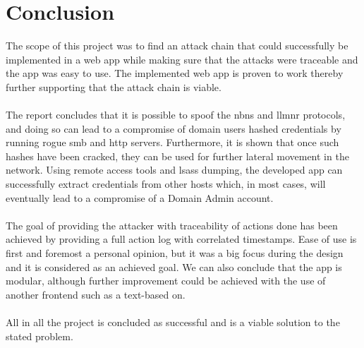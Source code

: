 \documentclass{article}
\begin{document}
\section{Conclusion}
The scope of this project was to find an attack chain that could successfully be implemented in a web app while making sure that the attacks were traceable and the app was easy to use. The implemented web app is proven to work thereby further supporting that the attack chain is viable.
\\
\\
The report concludes that it is possible to spoof the \gls{nbns} and \gls{llmnr} protocols, and doing so can lead to a compromise of domain users hashed credentials by running rogue \gls{smb} and \gls{http} servers. Furthermore, it is shown that once such hashes have been cracked, they can be used for further lateral movement in the network. Using remote access tools and \gls{lsass} dumping, the developed app can successfully extract credentials from other hosts which, in most cases, will eventually lead to a compromise of a Domain Admin account.
\\
\\
The goal of providing the attacker with traceability of actions done has been achieved by providing a full action log with correlated timestamps. Ease of use is first and foremost a personal opinion, but it was a big focus during the design and it is considered as an achieved goal. We can also conclude that the app is modular, although further improvement could be achieved with the use of another frontend such as a text-based on.
\\
\\
All in all the project is concluded as successful and is a viable solution to the stated problem.
\end{document}
